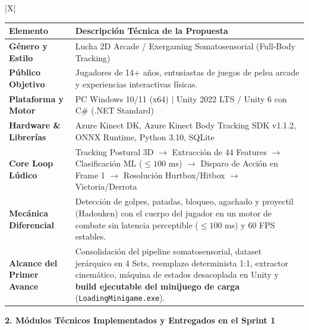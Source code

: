 \documentclass[10pt,a4paper]{article}
\begin{document}
{\begin{tabularx}{\textwidth}{|X|}
{    \begin{center}
    \fontsize{8pt}{9.5pt}\selectfont
    \begin{tabular}{|p{3.8cm}|p{12cm}|}
    \hline
    \rowcolor{gray!20} \textbf{Elemento} & \textbf{Descripción Técnica de la Propuesta} \\ \hline
    \textbf{Género y Estilo} & Lucha 2D Arcade / Exergaming Somatosensorial (Full-Body Tracking) \\ \hline
    \textbf{Público Objetivo} & Jugadores de 14+ años, entusiastas de juegos de pelea arcade y experiencias interactivas físicas. \\ \hline
    \textbf{Plataforma y Motor} & PC Windows 10/11 (x64) $|$ Unity 2022 LTS / Unity 6 con C\# (.NET Standard) \\ \hline
    \textbf{Hardware \& Librerías} & Azure Kinect DK, Azure Kinect Body Tracking SDK v1.1.2, ONNX Runtime, Python 3.10, SQLite \\ \hline
    \textbf{Core Loop Lúdico} & Tracking Postural 3D $\rightarrow$ Extracción de 44 Features $\rightarrow$ Clasificación ML ($\le 100$ ms) $\rightarrow$ Disparo de Acción en Frame 1 $\rightarrow$ Resolución Hurtbox/Hitbox $\rightarrow$ Victoria/Derrota \\ \hline
    \textbf{Mecánica Diferencial} & Detección de golpes, patadas, bloqueo, agachado y proyectil (Hadouken) con el cuerpo del jugador en un motor de combate sin latencia perceptible ($\le 100$ ms) y 60 FPS estables. \\ \hline
    \textbf{Alcance del Primer Avance} & Consolidación del pipeline somatosensorial, dataset jerárquico en 4 Sets, reemplazo determinista 1:1, extractor cinemático, máquina de estados desacoplada en Unity y \textbf{build ejecutable del minijuego de carga} (\texttt{LoadingMinigame.exe}). \\ \hline
    \end{tabular}
    \end{center}

    \vspace{0.2cm}
    \raggedright\textbf{\large 2. Módulos Técnicos Implementados y Entregados en el Sprint 1}\par\vspace{0.15cm}

}
\end{tabularx}}
\end{document}
